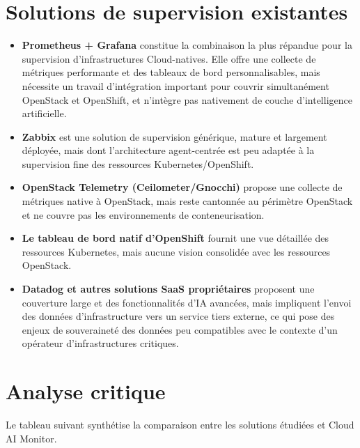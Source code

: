 \documentclass[11pt,a4paper]{report}
\begin{document}
\section{Solutions de supervision existantes}

\begin{itemize}[label=\textbullet, leftmargin=1.5cm, labelsep=0.5cm,
                itemsep=0.4em, parsep=0em, topsep=0.4em]

    \item \textbf{Prometheus + Grafana} constitue la combinaison la plus
    répandue pour la supervision d'infrastructures Cloud-natives. Elle offre
    une collecte de métriques performante et des tableaux de bord
    personnalisables, mais nécessite un travail d'intégration important pour
    couvrir simultanément OpenStack et OpenShift, et n'intègre pas nativement
    de couche d'intelligence artificielle.

    \item \textbf{Zabbix} est une solution de supervision générique, mature
    et largement déployée, mais dont l'architecture agent-centrée est peu
    adaptée à la supervision fine des ressources Kubernetes/OpenShift.

    \item \textbf{OpenStack Telemetry (Ceilometer/Gnocchi)} propose une
    collecte de métriques native à OpenStack, mais reste cantonnée au
    périmètre OpenStack et ne couvre pas les environnements de
    conteneurisation.

    \item \textbf{Le tableau de bord natif d'OpenShift} fournit une vue
    détaillée des ressources Kubernetes, mais aucune vision consolidée avec
    les ressources OpenStack.

    \item \textbf{Datadog et autres solutions SaaS propriétaires} proposent
    une couverture large et des fonctionnalités d'IA avancées, mais
    impliquent l'envoi des données d'infrastructure vers un service tiers
    externe, ce qui pose des enjeux de souveraineté des données peu
    compatibles avec le contexte d'un opérateur d'infrastructures critiques.

\end{itemize}

\section{Analyse critique}

Le tableau suivant synthétise la comparaison entre les solutions étudiées et
Cloud AI Monitor.
\end{document}

